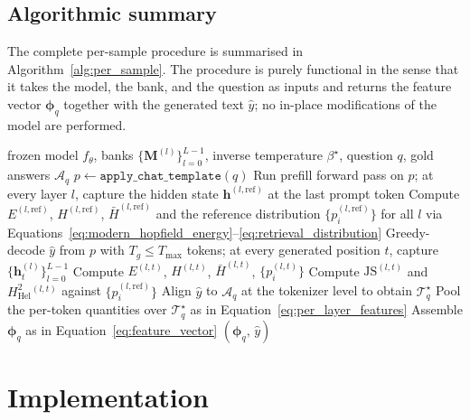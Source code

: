 \subsection{Algorithmic summary}
\label{subsec:algorithms}

The complete per-sample procedure is summarised in
Algorithm~\ref{alg:per_sample}. The procedure is purely functional in the
sense that it takes the model, the bank, and the question as inputs and
returns the feature vector $\boldsymbol{\phi}_q$ together with the
generated text $\hat{y}$; no in-place modifications of the model are
performed.

\begin{algorithm}[H]
\caption{Per-sample feature extraction}
\label{alg:per_sample}
\begin{algorithmic}[1]
\Require frozen model $f_\theta$, banks $\{\mathbf{M}^{(l)}\}_{l=0}^{L-1}$,
         inverse temperature $\beta^\star$, question $q$, gold answers $\mathcal{A}_q$
\State $p \gets \texttt{apply\_chat\_template}(q)$
\State Run prefill forward pass on $p$; at every layer $l$, capture the
       hidden state $\mathbf{h}^{(l,\mathrm{ref})}$ at the last prompt token
\State Compute $E^{(l,\mathrm{ref})}$, $H^{(l,\mathrm{ref})}$,
       $\bar{H}^{(l,\mathrm{ref})}$ and the reference distribution
       $\{p_i^{(l,\mathrm{ref})}\}$ for all $l$ via
       Equations~\eqref{eq:modern_hopfield_energy}--\eqref{eq:retrieval_distribution}
\State Greedy-decode $\hat{y}$ from $p$ with $T_g \le T_{\max}$ tokens; at
       every generated position $t$, capture
       $\{\mathbf{h}_t^{(l)}\}_{l=0}^{L-1}$
    \State Compute $E^{(l,t)}$, $H^{(l,t)}$, $\bar{H}^{(l,t)}$,
           $\{p_i^{(l,t)}\}$
    \State Compute $\mathrm{JS}^{(l,t)}$ and
           $H^2_{\mathrm{Hel}}{}^{(l,t)}$ against
           $\{p_i^{(l,\mathrm{ref})}\}$
\EndFor
\State Align $\hat{y}$ to $\mathcal{A}_q$ at the tokenizer level to obtain
       $\mathcal{T}_q^\star$
\State Pool the per-token quantities over $\mathcal{T}_q^\star$ as in
       Equation~\eqref{eq:per_layer_features}
\State Assemble $\boldsymbol{\phi}_q$ as in Equation~\eqref{eq:feature_vector}
\State \Return $(\boldsymbol{\phi}_q,\,\hat{y})$
\end{algorithmic}
\end{algorithm}

\section{Implementation}
\label{sec:implementation}

